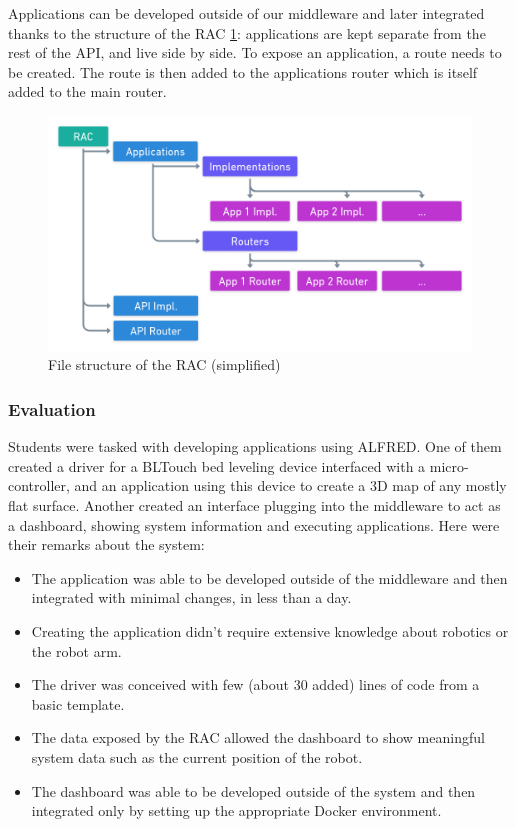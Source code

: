 Applications can be developed outside of our middleware and later integrated thanks to the structure of the RAC \ref{fig:api_file_structure}: applications are kept separate from the rest of the API, and live side by side. To expose an application, a route needs to be created. The route is then added to the applications router which is itself added to the main router.

\begin{figure}[h]
  \centering
  \includegraphics{images/API_file_structure.png}
  \caption{File structure of the RAC (simplified)}
  \label{fig:api_file_structure}
\end{figure}


\subsubsection{Evaluation}

Students were tasked with developing applications using ALFRED.
One of them created a driver for a BLTouch bed leveling device interfaced with a micro-controller, and an application using this device to create a 3D map of any mostly flat surface.
Another created an interface plugging into the middleware to act as a dashboard, showing system information and executing applications.
Here were their remarks about the system:

\begin{itemize}
  \item The application was able to be developed outside of the middleware and then integrated with minimal changes, in less than a day.
  \item Creating the application didn't require extensive knowledge about robotics or the robot arm.
  \item The driver was conceived with few (about 30 added) lines of code from a basic template.
  \item The data exposed by the RAC allowed the dashboard to show meaningful system data such as the current position of the robot.
  \item The dashboard was able to be developed outside of the system and then integrated only by setting up the appropriate Docker environment.
\end{itemize}


